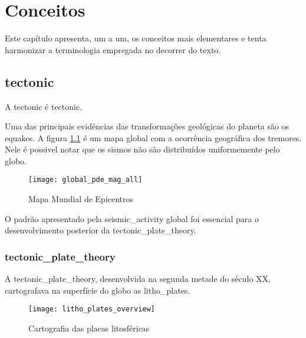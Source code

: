 \chapter{Conceitos}
\label{cap:conceitos}

Este capítulo apresenta, um a um, os conceitos mais elementares
e tenta harmonizar a terminologia empregada no decorrer do texto.


\section{\Gls{tectonic}}
\label{sec:02_tectonica}

A \gls{tectonic} é \glsdesc*{tectonic}.

Uma das principais evidências das transformações geológicas do planeta
são os \glspl{equake}. A figura \ref{f:global_epicenters} \citep{lowman_jr_1998}
é um mapa global com a ocorrência geográfica dos tremores. Nele é possivel notar que
os sismos não são distribuídos uniformemente pelo globo.

\begin{figure}[H]
   \centering
   \texttt{[image: global\_pde\_mag\_all]}
   \caption{Mapa Mundial de Epicentros}
   \label{f:global_epicenters}
\end{figure}

O padrão apresentado pela \gls{seismic_activity} global foi essencial
para o desenvolvimento posterior da \gls*{tectonic_plate_theory}.

\subsection{\Gls{tectonic_plate_theory}}
\label{sec:02_placas}

A \gls*{tectonic_plate_theory}, desenvolvida na segunda metade do século XX,
cartografava na superfície do globo as \glspl{litho_plate}.


\begin{figure}[H]
   \centering
   \texttt{[image: litho\_plates\_overview]}
   \caption[Cartografia das placas litosféricas]
   		   {Cartografia das placas litosféricas}
   \label{f:plates_overview}
\end{figure}

